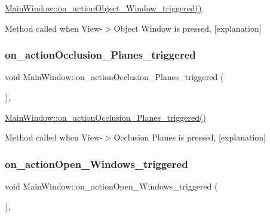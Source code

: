 \hyperlink{class_main_window_a584ef402e75f991b95af6dadbaac6354}{Main\+Window\+::on\+\_\+action\+Object\+\_\+\+Window\+\_\+triggered()} 

Method called when View-\/$>$Object Window is pressed, \mbox{[}explanation\mbox{]} \mbox{\label{class_main_window_a5276a8a1574c6344dbf4e2151caf0a08}} 
\subsubsection{\texorpdfstring{on\+\_\+action\+Occlusion\+\_\+\+Planes\+\_\+triggered}{on\_actionOcclusion\_Planes\_triggered}}
{\footnotesize\ttfamily void Main\+Window\+::on\+\_\+action\+Occlusion\+\_\+\+Planes\+\_\+triggered (\begin{DoxyParamCaption}{ }\end{DoxyParamCaption})\hspace{0.3cm}{\ttfamily [private]}, {\ttfamily [slot]}}



\hyperlink{class_main_window_a5276a8a1574c6344dbf4e2151caf0a08}{Main\+Window\+::on\+\_\+action\+Occlusion\+\_\+\+Planes\+\_\+triggered()} 

Method called when View-\/$>$Occlusion Planes is pressed, \mbox{[}explanation\mbox{]} \mbox{\label{class_main_window_a60eede6fe328bc95cccfe0c6d4a7696e}} 
\subsubsection{\texorpdfstring{on\+\_\+action\+Open\+\_\+\+Windows\+\_\+triggered}{on\_actionOpen\_Windows\_triggered}}
{\footnotesize\ttfamily void Main\+Window\+::on\+\_\+action\+Open\+\_\+\+Windows\+\_\+triggered (\begin{DoxyParamCaption}{ }\end{DoxyParamCaption})\hspace{0.3cm}{\ttfamily [private]}, {\ttfamily [slot]}}



